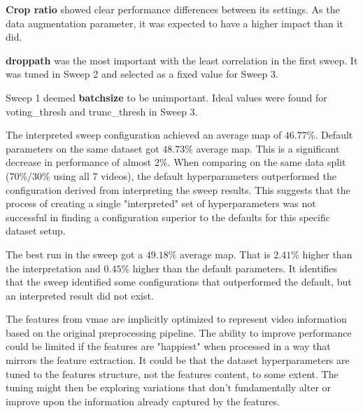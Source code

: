 \textbf{Crop ratio} showed clear performance differences between its settings. As the data augmentation parameter, it was expected to have a higher impact than it did. 

\textbf{droppath} was the most important with the least correlation in the first sweep. It was tuned in Sweep 2 and selected as a fixed value for Sweep 3. 

Sweep 1 deemed \textbf{batchsize} to be unimportant. Ideal values were found for voting\_thresh and trunc\_thresh in Sweep 3. 



The interpreted sweep configuration achieved an average \acrshort{map} of $46.77\%$. Default parameters on the same dataset got $48.73\%$ average \acrshort{map}. This is a significant decrease in performance of almost $2\%$. When comparing on the same data split (70\%/30\% using all 7 videos), the default hyperparameters outperformed the configuration derived from interpreting the sweep results. This suggests that the process of creating a single "interpreted" set of hyperparameters was not successful in finding a configuration superior to the defaults for this specific dataset setup.

The best run in the sweep got a $49.18\%$ average \acrshort{map}. That is $2.41\%$ higher than the interpretation and $0.45\%$ higher than the default parameters. It identifies that the sweep identified some configurations that outperformed the default, but an interpreted result did not exist. 



The features from \acrshort{vmae} are implicitly optimized to represent video information based on the original preprocessing pipeline. The ability to improve performance could be limited if the features are "happiest" when processed in a way that mirrors the feature extraction. It could be that the dataset hyperparameters are tuned to the features structure, not the features content, to some extent. The tuning might then be exploring variations that don't fundamentally alter or improve upon the information already captured by the features. 

